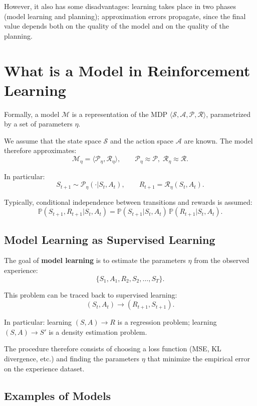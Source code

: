 However, it also has some disadvantages:
learning takes place in two phases (model learning and planning);
approximation errors propagate, since the final value depends both on the quality of the model and on the quality of the planning.

\section{What is a Model in Reinforcement Learning}

Formally, a model $\mathcal{M}$ is a representation of the MDP
$\langle \mathcal{S}, \mathcal{A}, \mathcal{P}, \mathcal{R} \rangle$,
parametrized by a set of parameters $\eta$.

We assume that the state space $\mathcal{S}$ and the action space $\mathcal{A}$ are known.
The model therefore approximates:
\[
\mathcal{M}_\eta = \langle \mathcal{P}_\eta, \mathcal{R}_\eta \rangle,
\qquad
\mathcal{P}_\eta \approx \mathcal{P}, \;
\mathcal{R}_\eta \approx \mathcal{R}.
\]

In particular:
\[
S_{t+1} \sim \mathcal{P}_\eta(\cdot | S_t, A_t),
\qquad
R_{t+1} = \mathcal{R}_\eta(S_t, A_t).
\]

Typically, conditional independence between transitions and rewards is assumed:
\[
\mathbb{P}(S_{t+1}, R_{t+1} | S_t, A_t)
=
\mathbb{P}(S_{t+1} | S_t, A_t)\,
\mathbb{P}(R_{t+1} | S_t, A_t).
\]

\subsection{Model Learning as Supervised Learning}

The goal of \textbf{model learning} is to estimate the parameters $\eta$ from the observed experience:
\[
\{ S_1, A_1, R_2, S_2, \dots, S_T \}.
\]

This problem can be traced back to supervised learning:
\[
(S_t, A_t) \longrightarrow (R_{t+1}, S_{t+1}).
\]

In particular:
learning $(S,A) \rightarrow R$ is a regression problem;
learning $(S,A) \rightarrow S'$ is a density estimation problem.

The procedure therefore consists of choosing a loss function (MSE, KL divergence, etc.)
and finding the parameters $\eta$ that minimize the empirical error on the experience dataset.

\subsection{Examples of Models}

